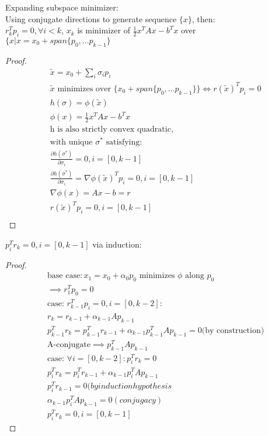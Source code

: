 \documentclass[8pt,letter]{article}
\begin{document}
\begin{multicols*}{2}
  Expanding subspace minimizer:\\
  Using conjugate directions to generate sequence $\{x\}$, then:\\
  $r_k^T p_i = 0, \forall i < k$, $x_k$ is minimizer of $\frac{1}{2} x^TAx - b^Tx$ over $\{ x | x= x_0 + span\{p_0,...p_{k-1}\}$
  \begin{proof}
    \begin{align*}
      &\tilde{x} = x_0 + \sum_i \sigma_i p_i\\
      &\tilde{x} \text{ minimizes over }\{x_0 + span\{ p_0, ... p_{k-1}\}\} \iff r(\tilde{x})^Tp_i = 0\\
      &h(\sigma) = \phi(\tilde{x})\\
      &\phi(x) =\frac{1}{2}x^TAx-b^Tx\\
      &\text{h is also strictly convex quadratic,}\\
      &\text{with unique }\sigma^*\text{ satisfying:}\\
      &\frac{\partial h(\sigma^*)}{\partial \sigma_i} = 0, i=[0,k-1]\\
      &\frac{\partial h(\sigma^*)}{\partial \sigma_i} = \nabla \phi(\tilde{x})^T p_i = 0, i = [0,k-1]\\
      &\nabla \phi(x) = Ax-b=r\\
      &r(\tilde{x})^T p_i = 0, i=[0,k-1]\\
    \end{align*}  
  \end{proof}
  $p_i^T r_k=0, i=[0,k-1]$ via induction:
  \begin{proof}
    \begin{align*}
      &\text{base case}: x_1 = x_0 + \alpha_0 p_0 \text{ minimizes } \phi \text{ along } p_0\\
      &\implies r_1^T p_0 = 0\\
      &\text{case: }r_{k-1}^T p_i = 0, i=[0,k-2]:\\
      &r_k = r_{k-1} + \alpha_{k-1} A p_{k-1}\\
      &p_{k-1}^T r_k = p_{k-1}^T r_{k-1} + \alpha_{k-1} p_{k-1}^T  A p_{k-1}=0(\text{by construction)}\\
      &\text{A-conjugate} \implies p_{k-1}^T A p_{k-1}\\
      &\text{case: }\forall i=[0,k-2]: p_i^T r_k=0\\
      &p_i^T r_k = p_i^T r_{k-1} + \alpha_{k-1} p_i^T A p_{k-1}\\
      &p_i^T r_{k-1} = 0 (by induction hypothesis\\
      &\alpha_{k-1} p_i^T A p_{k-1} = 0 (conjugacy)\\
      &p_i^T r_k = 0, i=[0,k-1]
    \end{align*}
  \end{proof}


\end{multicols*}
\end{document}
